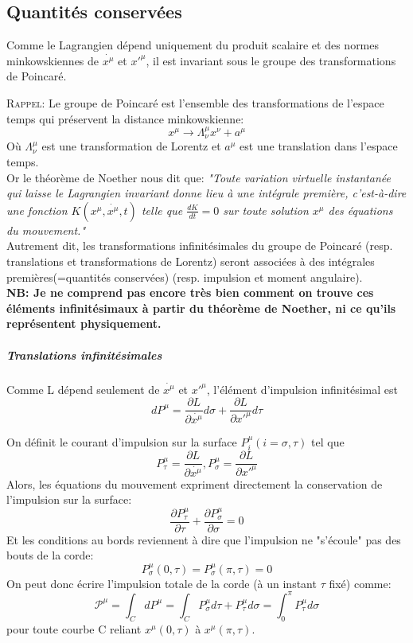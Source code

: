 \documentclass[a4paper,12pt]{article}
\begin{document}
\subsection{Quantités conservées}
Comme le Lagrangien dépend uniquement du produit scalaire et des normes minkowskiennes de $\dot{x^{\mu}}$ et $x'^{\mu}$, il est invariant sous le groupe des transformations de Poincaré.

\textsc{Rappel}: Le groupe de Poincaré est l'ensemble des transformations de l'espace temps qui préservent la distance minkowskienne:
$$ x^{\mu}\rightarrow\Lambda_{\nu}^{\mu}x^{\nu}+a^{\mu}$$ 
Où $\Lambda_{\nu}^{\mu}$ est une transformation de Lorentz et $a^{\mu}$ est une translation dans l'espace temps.\\
Or le théorème de Noether nous dit que:
\textit{"Toute variation virtuelle instantanée qui laisse le Lagrangien invariant donne lieu à une intégrale première, c'est-à-dire une fonction $K(x^{\mu},\dot{x^{\mu}},t)$ telle que $\frac{dK}{dt}=0$ sur toute solution $x^{\mu}$ des équations du mouvement."}\\
Autrement dit, les transformations infinitésimales du groupe de Poincaré (resp. translations  et transformations de Lorentz) seront associées à des intégrales premières(=quantités conservées) (resp. impulsion et moment angulaire).\\ 
\textbf{NB: Je ne comprend pas encore très bien comment on trouve ces éléments infinitésimaux à partir du théorème de Noether, ni ce qu'ils représentent physiquement.}
\subparagraph{Translations infinitésimales}
Comme L dépend seulement de $\dot{x^{\mu}}$ et $x'^{\mu}$, 
l'élément d'impulsion infinitésimal est 
$$dP^{\mu}=\frac{\partial L}{\partial \dot{x^{\mu}}}d\sigma+\frac{\partial L}{\partial x'^{\mu}}d\tau$$

On définit le courant d'impulsion sur la surface $P^{\mu}_{i}(i=\sigma,\tau)$ tel que 
$$P^{\mu}_{\tau}=\frac{\partial L}{\partial \dot{x^{\mu}}},			 P^{\mu}_{\sigma}=\frac{\partial L}{\partial x'^{\mu}}$$
Alors, les équations du mouvement expriment directement la conservation de l'impulsion sur la surface:
$$\frac{\partial P^{\mu}_{\tau}}{\partial \tau}+\frac{\partial P^{\mu}_{\sigma}}{\partial \sigma}=0$$
Et les conditions au bords reviennent à dire que l'impulsion ne "s'écoule" pas des bouts de la corde: $$P^{\mu}_{\sigma}(0,\tau)=P^{\mu}_{\sigma}(\pi,\tau)=0$$
On peut donc écrire l'impulsion totale de la corde (à un instant $\tau$ fixé) comme:
$$\mathcal{P^{\mu}}=\int_{C}dP^{\mu}=\int_{C}P^{\mu}_{\sigma}d\tau+P^{\mu}_{\tau}d\sigma=\int_{0}^{\pi}P^{\mu}_{\tau}d\sigma$$
pour toute courbe C reliant $x^{\mu}(0,\tau)$ à $x^{\mu}(\pi,\tau)$.
\end{document}
